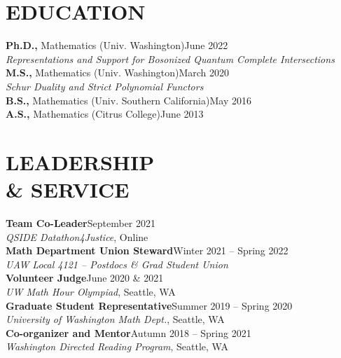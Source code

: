 \documentclass[margin]{res} %
\begin{document}
\begin{resume}



    \section{EDUCATION}

     {\bf Ph.D.,} Mathematics (Univ. Washington)\hfill June 2022 \\\smallskip
    {\it Representations and Support for Bosonized Quantum Complete Intersections}\\
    {\bf M.S.,} Mathematics (Univ. Washington)\hfill March 2020 \\\smallskip
    {\it Schur Duality and Strict Polynomial Functors}\\
    {\bf B.S.,} Mathematics (Univ. Southern California)\hfill May 2016\\
    {\bf A.S.,} Mathematics (Citrus College)\hfill June 2013

    \section{LEADERSHIP \\\& SERVICE}
     {\bf Team Co-Leader}\hfill September 2021\\\smallskip
    {\sl QSIDE Datathon4Justice}, Online \\
    {\bf Math Department Union Steward}\hfill Winter 2021 -- Spring 2022\\\smallskip
    {\sl UAW Local 4121 -- Postdocs \& Grad Student Union}\\
    {\bf Volunteer Judge}\hfill June 2020 \& 2021\\\smallskip
    {\sl UW Math Hour Olympiad}, Seattle, WA\\
    {\bf Graduate Student Representative}\hfill Summer 2019 -- Spring 2020\\\smallskip
    {\sl University of Washington Math Dept.}, Seattle, WA\\
    {\bf Co-organizer and Mentor}\hfill Autumn 2018 -- Spring 2021\\
    {\sl Washington Directed Reading Program}, Seattle, WA

\end{resume}
\end{document}
